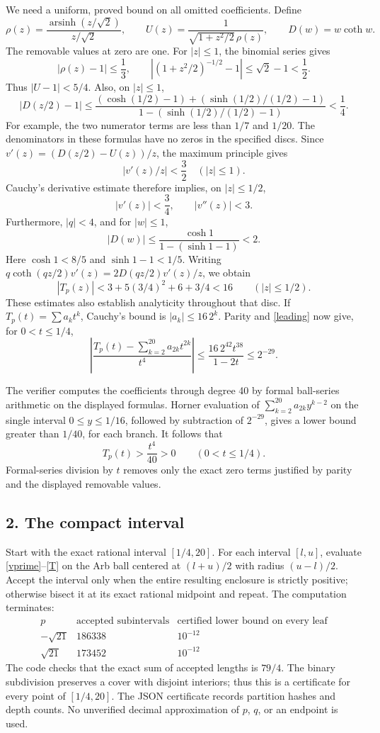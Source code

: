 \documentclass[11pt]{article}
\newcommand{\asinh}{\operatorname{arsinh}}
\begin{document}
We need a uniform, proved bound on all omitted coefficients. Define
\[
 \rho(z)=\frac{\asinh(z/\sqrt2)}{z/\sqrt2},\qquad
 U(z)=\frac1{\sqrt{1+z^2/2}\,\rho(z)},\qquad
 D(w)=w\coth w.
\]
The removable values at zero are one. For \(|z|\le1\), the binomial
series gives
\[
 |\rho(z)-1|\le\frac13,\qquad
 |(1+z^2/2)^{-1/2}-1|\le\sqrt2-1<\frac12.
\]
Thus \(|U-1|<5/4\). Also, on \(|z|\le1\),
\[
 |D(z/2)-1|
 \le\frac{(\cosh(1/2)-1)+(\sinh(1/2)/(1/2)-1)}
 {1-(\sinh(1/2)/(1/2)-1)}<\frac14.
\]
For example, the two numerator terms are less than \(1/7\) and \(1/20\).
The denominators in these formulas have no zeros in the specified
discs. Since \(v'(z)=(D(z/2)-U(z))/z\), the maximum principle gives
\[
 |v'(z)/z|<\frac32\quad(|z|\le1).
\]
Cauchy's derivative estimate therefore implies, on \(|z|\le1/2\),
\[
 |v'(z)|<\frac34,\qquad |v''(z)|<3.
\]
Furthermore, \(|q|<4\), and for \(|w|\le1\),
\[
 |D(w)|\le\frac{\cosh1}{1-(\sinh1-1)}<2.
\]
Here \(\cosh1<8/5\) and \(\sinh1-1<1/5\).
Writing \(q\coth(qz/2)v'(z)=2D(qz/2)v'(z)/z\), we obtain
\[
 |T_p(z)|<3+5(3/4)^2+6+3/4<16\qquad(|z|\le1/2).
\]
These estimates also establish analyticity throughout that disc.
If \(T_p(t)=\sum a_k t^k\), Cauchy's bound is
\(|a_k|\le16\,2^k\).
Parity and \eqref{leading} now give, for \(0<t\le1/4\),
\begin{equation}\label{tailzero}
 \left|\frac{T_p(t)-\sum_{k=2}^{20}a_{2k}t^{2k}}{t^4}\right|
 \le\frac{16\,2^{42}t^{38}}{1-2t}\le 2^{-29}.
\end{equation}

The verifier computes the coefficients through degree 40 by formal
ball-series arithmetic on the displayed formulas. Horner evaluation
of \(\sum_{k=2}^{20}a_{2k}y^{k-2}\) on the single interval
\(0\le y\le1/16\), followed by subtraction of \(2^{-29}\), gives a
lower bound greater than \(1/40\), for each branch. It follows that
\[
 T_p(t)>\frac{t^4}{40}>0\qquad(0<t\le1/4).
\]
Formal-series division by \(t\) removes only the exact zero terms
justified by parity and the displayed removable values.

\subsection*{2. The compact interval}
Start with the exact rational interval \([1/4,20]\). For each interval
\([l,u]\), evaluate \eqref{vprime}--\eqref{T} on the Arb ball centered
at \((l+u)/2\) with radius \((u-l)/2\). Accept the interval only when
the entire resulting enclosure is strictly positive; otherwise bisect
it at its exact rational midpoint and repeat. The computation terminates:
\[
\begin{array}{c|r|c}
 p&\text{accepted subintervals}&\text{certified lower bound on every leaf}\\
 \hline
 -\sqrt{21}&186338&10^{-12}\\
 \sqrt{21}&173452&10^{-12}
\end{array}
\]
The code checks that the exact sum of accepted lengths is \(79/4\).
The binary subdivision preserves a cover with disjoint interiors;
thus this is a certificate for every point of \([1/4,20]\).
The JSON certificate records partition hashes and depth counts.
No unverified decimal approximation of \(p\), \(q\), or an endpoint
is used.
\end{document}
